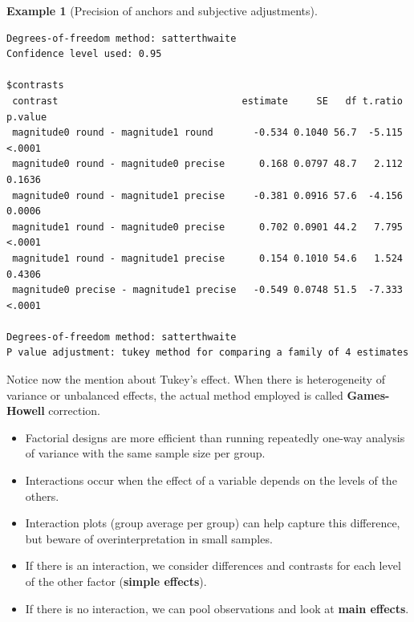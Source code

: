 \documentclass[
  11pt,
  letterpaper,
]{scrbook}
\providecommand{\tightlist}{%
  \setlength{\itemsep}{0pt}\setlength{\parskip}{0pt}}\usepackage{longtable,booktabs,array}
\theoremstyle{definition}
\theoremstyle{definition}
\newtheorem{example}{Example}[chapter]
\theoremstyle{remark}
\begin{document}
\begin{example}[Precision of anchors and subjective
adjustments]
\begin{verbatim}
Degrees-of-freedom method: satterthwaite 
Confidence level used: 0.95 

$contrasts
 contrast                                estimate     SE   df t.ratio p.value
 magnitude0 round - magnitude1 round       -0.534 0.1040 56.7  -5.115  <.0001
 magnitude0 round - magnitude0 precise      0.168 0.0797 48.7   2.112  0.1636
 magnitude0 round - magnitude1 precise     -0.381 0.0916 57.6  -4.156  0.0006
 magnitude1 round - magnitude0 precise      0.702 0.0901 44.2   7.795  <.0001
 magnitude1 round - magnitude1 precise      0.154 0.1010 54.6   1.524  0.4306
 magnitude0 precise - magnitude1 precise   -0.549 0.0748 51.5  -7.333  <.0001

Degrees-of-freedom method: satterthwaite 
P value adjustment: tukey method for comparing a family of 4 estimates 
\end{verbatim}

Notice now the mention about Tukey's effect. When there is heterogeneity
of variance or unbalanced effects, the actual method employed is called
\textbf{Games-Howell} correction.

\end{example}

\begin{tcolorbox}[enhanced jigsaw, left=2mm, leftrule=.75mm, coltitle=black, breakable, bottomrule=.15mm, colframe=quarto-callout-important-color-frame, titlerule=0mm, colbacktitle=quarto-callout-important-color!10!white, rightrule=.15mm, toprule=.15mm, title=\textcolor{quarto-callout-important-color}{\faExclamation}\hspace{0.5em}{\textbf{Summary}}, opacityback=0, toptitle=1mm, bottomtitle=1mm, arc=.35mm, opacitybacktitle=0.6, colback=white]

\begin{itemize}
\tightlist
\item
  Factorial designs are more efficient than running repeatedly one-way
  analysis of variance with the same sample size per group.
\item
  Interactions occur when the effect of a variable depends on the levels
  of the others.
\item
  Interaction plots (group average per group) can help capture this
  difference, but beware of overinterpretation in small samples.
\item
  If there is an interaction, we consider differences and contrasts for
  each level of the other factor (\textbf{simple effects}).
\item
  If there is no interaction, we can pool observations and look at
  \textbf{main effects}.
\end{itemize}

\end{tcolorbox}
\end{document}
